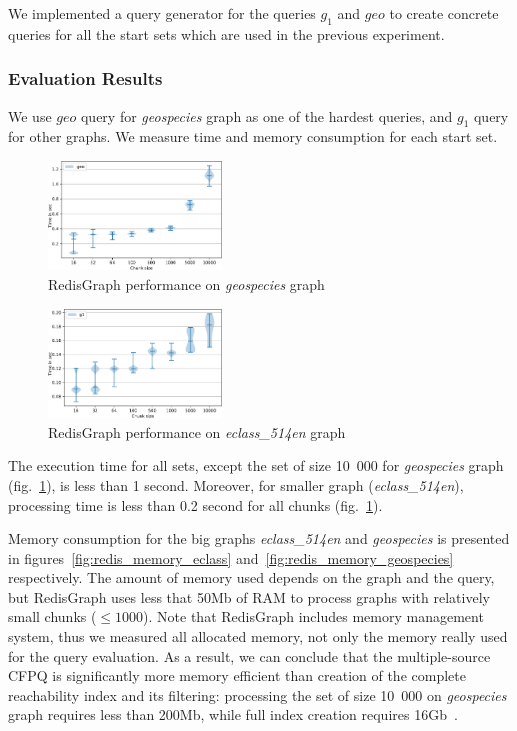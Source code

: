 We implemented a query generator for the queries $g_1$ and $geo$ to create concrete queries for all the start sets which are used in the previous experiment.


\subsubsection{Evaluation Results}

We use $geo$ query for \textit{geospecies} graph as one of the hardest queries, and $g_1$ query for other graphs.
We measure time and memory consumption for each start set.

\begin{figure}[h]
\centering
\includegraphics[width=0.41\textwidth]{data/raw_redis/geospecies.pdf}
\caption{RedisGraph performance on \textit{geospecies} graph}
\label{fig:redis_geospecies_all}
\end{figure}

\begin{figure}[h]
\centering
\includegraphics[width=0.41\textwidth]{data/raw_redis/eclass_514en.pdf}
\caption{RedisGraph performance on \textit{eclass\_514en} graph}
\label{fig:redis_eclass_all}
\end{figure}

The execution time for all sets, except the set of size 10~000 for \textit{geospecies} graph (fig.~\ref{fig:redis_geospecies_all}), is less than 1 second.
Moreover, for smaller graph (\textit{eclass\_514en}), processing time is less than 0.2 second for all chunks (fig.~\ref{fig:redis_geospecies_all}).

Memory consumption for the big graphs \textit{eclass\_514en} and \textit{geospecies} is presented in figures~\ref{fig:redis_memory_eclass} and~\ref{fig:redis_memory_geospecies} respectively.
The amount of memory used depends on the graph and the query, but RedisGraph uses less that 50Mb of RAM to process graphs with relatively small chunks ($\leq 1000$).
Note that RedisGraph includes memory management system, thus we measured all allocated memory, not only the memory really used for the query evaluation.
As a result, we can conclude that the multiple-source CFPQ is significantly more memory efficient than creation of the complete reachability index and its filtering: processing the set of size 10~000 on \textit{geospecies} graph requires less than 200Mb, while full index creation requires 16Gb~\cite{10.1145/3398682.3399163}.

